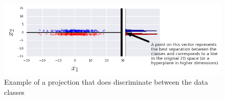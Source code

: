 \documentclass{article}
\begin{document}
%
%
%


\begin{figure}[h]
\center
\includegraphics[width=15cm]{best_projection}
\caption{Example of a projection that does discriminate between the data classes}\label{fig:best_proj}
\end{figure}
\end{document}
